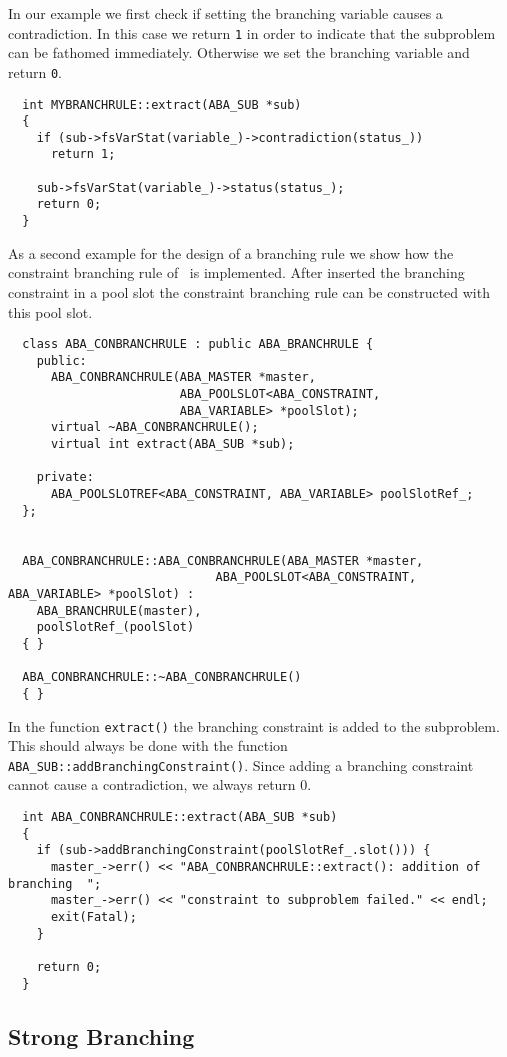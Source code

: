 In our example we first check if setting the branching variable causes
a contradiction. In this case we return {\tt 1} in order to indicate
that the subproblem can be fathomed immediately. Otherwise we set the
branching variable and return {\tt 0}.
\begin{verbatim}
  int MYBRANCHRULE::extract(ABA_SUB *sub)
  {
    if (sub->fsVarStat(variable_)->contradiction(status_))
      return 1;
    
    sub->fsVarStat(variable_)->status(status_);
    return 0;
  }
\end{verbatim}
As a second example for the design of a branching rule we show how the
constraint branching rule of \ABACUS\ is implemented. After inserted
the branching constraint in a pool slot the constraint branching rule 
can be constructed with this pool slot.
\begin{verbatim}
  class ABA_CONBRANCHRULE : public ABA_BRANCHRULE {
    public:
      ABA_CONBRANCHRULE(ABA_MASTER *master,
                        ABA_POOLSLOT<ABA_CONSTRAINT, 
                        ABA_VARIABLE> *poolSlot);
      virtual ~ABA_CONBRANCHRULE();
      virtual int extract(ABA_SUB *sub);

    private:
      ABA_POOLSLOTREF<ABA_CONSTRAINT, ABA_VARIABLE> poolSlotRef_;
  };


  ABA_CONBRANCHRULE::ABA_CONBRANCHRULE(ABA_MASTER *master,
                             ABA_POOLSLOT<ABA_CONSTRAINT, ABA_VARIABLE> *poolSlot) :
    ABA_BRANCHRULE(master),
    poolSlotRef_(poolSlot)
  { }

  ABA_CONBRANCHRULE::~ABA_CONBRANCHRULE()
  { }
\end{verbatim}
In the function {\tt extract()} the branching constraint is added to
the subproblem. This should always be done with the function
{\tt ABA\_SUB::addBranchingConstraint()}. Since adding a branching
constraint cannot cause a contradiction, we always return 0.
\begin{verbatim}
  int ABA_CONBRANCHRULE::extract(ABA_SUB *sub)
  {
    if (sub->addBranchingConstraint(poolSlotRef_.slot())) {
      master_->err() << "ABA_CONBRANCHRULE::extract(): addition of branching  ";
      master_->err() << "constraint to subproblem failed." << endl;
      exit(Fatal);
    }

    return 0;
  }
\end{verbatim}

\subsection{Strong Branching}
\label{section:StrongBranching}

